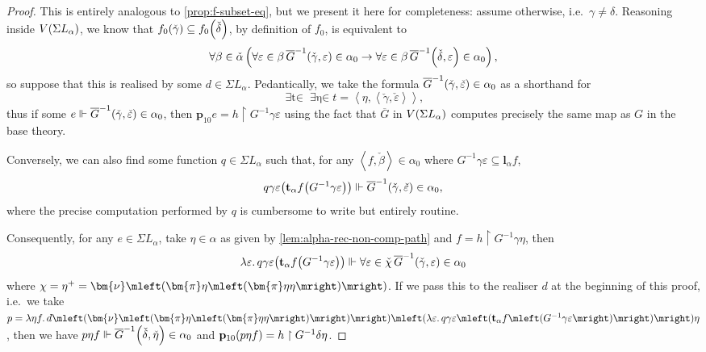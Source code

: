 \documentclass[12pt,openany]{book}
\theoremstyle{plain}
\theoremstyle{definition}
\newcommand\tuple[1]{\left\langle #1 \right\rangle}
\newcommand\opA[1]{\mathop{\forall #1}}
\newcommand\opE[1]{\mathop{\exists #1}}
\newcommand\oplam[1]{\mathop{\lambda #1.}}
\newcommand\bp{\mathbf{p}}
\newcommand\bl{\mathbf{l}}
\newcommand\bt{\mathbf{t}}
\begin{document}
\begin{proof}
  This is entirely analogous to \autoref{prop:f-subset-eq}, but we present it here for completeness: assume otherwise, i.e.\ $\gamma \neq \delta$. Reasoning inside $V\mleft(\Sigma L_\alpha\mright)$, we know that $f_0\mleft(\check{\gamma}\mright) \subseteq f_0\mleft(\check{\delta}\mright)$, by definition of $f_0$, is equivalent to
  \[\opA{\beta \in \check{\alpha}} \left(\opA{\varepsilon \in \beta} \overline{G}^{-1}\mleft(\check{\gamma}, \varepsilon\mright) \in \alpha_0 \rightarrow \opA{\varepsilon \in \beta} \overline{G}^{-1}\mleft(\check{\delta}, \varepsilon\mright) \in \alpha_0\right),\]
  so suppose that this is realised by some $d \in \Sigma L_\alpha$. Pedantically, we take the formula $\overline{G}^{-1}\mleft(\check{\gamma}, \check{\varepsilon}\mright) \in \alpha_0$ as a shorthand for
  \[\opE{t \in \overline{G}} \opE{\eta \in \alpha_0} t = \tuple{\eta, \tuple{\check{\gamma}, \check{\varepsilon}}},\]
  thus if some $e \Vdash \overline{G}^{-1}\mleft(\check{\gamma}, \check{\varepsilon}\mright) \in \alpha_0$, then $\bp_{10} e = h \upharpoonright G^{-1} \gamma \varepsilon$ using the fact that $\overline{G}$ in $V\mleft(\Sigma L_\alpha\mright)$ computes precisely the same map as $G$ in the base theory.

  Conversely, we can also find some function $q \in \Sigma L_\alpha$ such that, for any $\tuple{f, \check{\beta}} \in \alpha_0$ where $G^{-1} \gamma \varepsilon \subseteq \bl_\alpha f$,
  \[q \gamma \varepsilon \mleft(\bt_\alpha f \mleft(G^{-1} \gamma \varepsilon\mright)\mright) \Vdash \overline{G}^{-1}\mleft(\check{\gamma}, \check{\varepsilon}\mright) \in \alpha_0,\]
  where the precise computation performed by $q$ is cumbersome to write but entirely routine.

  Consequently, for any $e \in \Sigma L_\alpha$, take $\eta \in \alpha$ as given by \autoref{lem:alpha-rec-non-comp-path} and $f = h \upharpoonright G^{-1} \gamma \eta$, then
  \[\oplam{\varepsilon} q \gamma \varepsilon \mleft(\bt_\alpha f \mleft(G^{-1} \gamma \varepsilon\mright)\mright) \Vdash \opA{\varepsilon \in \check{\chi}} \overline{G}^{-1}\mleft(\check{\gamma}, \varepsilon\mright) \in \alpha_0\]
  where $\chi = \eta^+ = \bm{\nu} \mleft(\bm{\pi} \eta \mleft(\bm{\pi} \eta \eta\mright)\mright)$. If we pass this to the realiser $d$ at the beginning of this proof, i.e.\ we take $p = \oplam{\eta f} d \mleft(\bm{\nu} \mleft(\bm{\pi} \eta \mleft(\bm{\pi} \eta \eta\mright)\mright)\mright) \mleft(\oplam{\varepsilon} q \gamma \varepsilon \mleft(\bt_\alpha f \mleft(G^{-1} \gamma \varepsilon\mright)\mright)\mright) \eta$, then we have $p \eta f \Vdash \overline{G}^{-1}\mleft(\check{\delta}, \check{\eta}\mright) \in \alpha_0$ and $\bp_{10} \mleft(p \eta f\mright) = h \upharpoonright G^{-1} \delta \eta$.


\end{proof}
\end{document}
